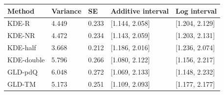 \begin{tabular}{lllll}
\toprule
Method & Variance & SE & Additive interval & Log interval \\
\midrule
KDE-R & 4.449 & 0.233 & [1.144, 2.058] & [1.204, 2.129] \\
KDE-NR & 4.472 & 0.234 & [1.143, 2.059] & [1.203, 2.131] \\
KDE-half & 3.668 & 0.212 & [1.186, 2.016] & [1.236, 2.074] \\
KDE-double & 5.796 & 0.266 & [1.080, 2.122] & [1.156, 2.217] \\
GLD-pdQ & 6.048 & 0.272 & [1.069, 2.133] & [1.148, 2.232] \\
GLD-TM & 5.173 & 0.251 & [1.109, 2.093] & [1.177, 2.177] \\
\bottomrule
\end{tabular}
